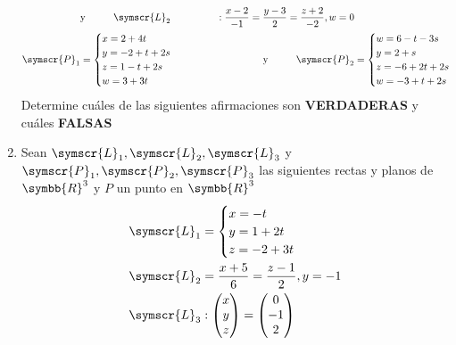 \documentclass{article}
\def\fancyL{\symscr{L}}
\def\fancyP{\symscr{P}}
\def\realR{\symbb{R}}
\begin{document}
\begin{enumerate}
\[\begin{aligned}
            &\text{y}
            \hspace{1cm}
            \fancyL_2 &:
            \frac{x - 2}{-1} =
            \frac{y - 3}{2} =
            \frac{z + 2}{-2}, w = 0 \\
            \fancyP_1 &=
            \begin{cases}
                x = 2 + 4t \\
                y = -2 + t + 2s \\
                z = 1 -t + 2s \\
                w = 3 + 3t
            \end{cases}
            \hspace{1cm}
            &\text{y}
            \hspace{1cm}
            \fancyP_2 &=
            \begin{cases}
                w = 6 - t - 3s \\
                y = 2 + s \\
                z = -6 + 2t + 2s \\
                w = -3 + t + 2s
            \end{cases}
        \end{aligned}
    \]
    Determine cuáles de las siguientes afirmaciones son \textbf{VERDADERAS} y cuáles \textbf{FALSAS}
\item Sean \(\fancyL_1, \fancyL_2, \fancyL_3\) y \(\fancyP_1, \fancyP_2, \fancyP_3\) las siguientes rectas y planos de \(\realR^3\) y \(P\) un punto en \(\realR^3\)
    \[
        \begin{aligned}
            \fancyL_1 &=
            \begin{cases}
                x = -t \\
                y = 1 + 2t \\
                z = -2 + 3t
            \end{cases} \\
            \fancyL_2 &=
            \frac{x + 5}{6} =
            \frac{z - 1}{2},
            y = -1 \\
            \fancyL_3 &: 
            \begin{pmatrix}x \\ y \\ z\end{pmatrix}
            =
            \begin{pmatrix}0 \\ -1 \\ 2\end{pmatrix}

\end{aligned}\]
\end{enumerate}
\end{document}
